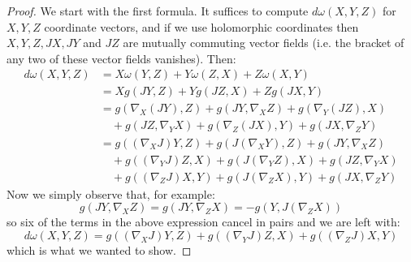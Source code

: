 \documentclass[11pt]{amsart}
\theoremstyle{definition}
\begin{document}
\begin{proof} We start with the first formula.  It suffices to compute $d \omega( X,Y,Z )$ for $X,Y,Z$ coordinate vectors, and if we use holomorphic coordinates then $X,Y,Z,JX,JY$ and $JZ$ are mutually commuting vector fields (i.e. the bracket of any two of these vector fields vanishes).  Then:
%
\begin{align*}
d \omega( X, Y, Z ) &= X \omega(Y,Z) + Y \omega(Z,X) + Z \omega(X,Y) \\
%
&= X g( JY, Z ) + Y g( JZ, X ) + Z g( JX, Y ) \\
%
&= g( \nabla_X (JY), Z ) + g( JY, \nabla_X Z) + g( \nabla_Y (JZ), X )\\
& \quad + g( JZ, \nabla_Y X ) + g( \nabla_Z (JX), Y ) + g( JX, \nabla_Z Y ) \\
%
&= g( (\nabla_X J)Y, Z ) + g( J( \nabla_X Y ), Z ) + g( JY, \nabla_X Z) \\
& \quad + g( (\nabla_Y J)Z, X ) + g( J( \nabla_Y Z ), X ) + g( JZ, \nabla_Y X ) \\
& \quad + g( (\nabla_Z J)X, Y ) + g( J( \nabla_Z X ), Y ) + g( JX, \nabla_Z Y )
\end{align*}
%
Now we simply observe that, for example:
%
$$ g( JY, \nabla_X Z) = g( JY, \nabla_Z X ) = - g( Y, J( \nabla_Z X ) )$$
%
so six of the terms in the above expression cancel in pairs and we are left with:
%
$$ d \omega( X, Y, Z ) = g( (\nabla_X J)Y, Z) + g( (\nabla_Y J)Z, X ) + g( (\nabla_Z J)X, Y ) $$
%
which is what we wanted to show.



\end{proof}
\end{document}

